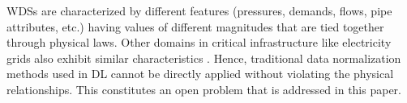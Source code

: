 WDSs are characterized by different features (pressures, demands, flows, pipe attributes, etc.) having values of different magnitudes that are tied together through physical laws. Other domains in critical infrastructure like electricity grids also exhibit similar characteristics \cite{ghamizi2024}. Hence, traditional data normalization methods used in DL cannot be directly applied without violating the physical relationships. This constitutes an open problem that is addressed in this paper.